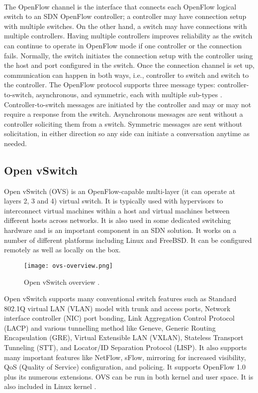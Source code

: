 \paragraph{}
The OpenFlow channel is the interface that connects each OpenFlow logical switch to an SDN OpenFlow controller; a controller may have connection setup with multiple switches. On the other hand, a switch may have connections with multiple controllers. Having multiple controllers improves reliability as the switch can continue to operate in OpenFlow mode if one controller or the connection fails. Normally, the switch initiates the connection setup with the controller using the host and port configured in the switch. Once the connection channel is set up, communication can happen in both ways, i.e., controller to switch and switch to the controller. The OpenFlow protocol supports three message types: controller-to-switch, asynchronous, and symmetric, each with multiple sub-types \cite{openflowspecification13}. Controller-to-switch messages are initiated by the controller and may or may not require a response from the switch. Asynchronous messages are sent without a controller soliciting them from a switch. Symmetric messages are sent without solicitation, in either direction so any side can initiate a conversation anytime as needed.

\subsection{Open vSwitch}\label{sec:ovs}
Open vSwitch (OVS) is an OpenFlow-capable multi-layer (it can operate at layers 2, 3 and 4) virtual switch. It is typically used with hypervisors to interconnect virtual machines within a host and virtual machines between different hosts across networks. It is also used in some dedicated switching hardware and is an important component in an SDN solution. It works on a number of different platforms including Linux and FreeBSD. It can be configured remotely as well as locally on the box.

\begin{figure}[H]
\begin{center}
	{\texttt{[image: ovs-overview.png]}}
	\caption{Open vSwitch overview \cite{ovswhatis}.}
	\label{fig:ovsoverview}
\end{center}
\end{figure}

Open vSwitch supports many conventional switch features such as Standard 802.1Q virtual LAN (VLAN) model with trunk and access ports, Network interface controller (NIC) port bonding, Link Aggregation Control Protocol (LACP) and various tunnelling method like Geneve, Generic Routing Encapsulation (GRE), Virtual Extensible LAN (VXLAN), Stateless Transport Tunneling (STT), and Locator/ID Separation Protocol (LISP). It also supports many important features like NetFlow, sFlow, mirroring for increased visibility, QoS (Quality of Service) configuration, and policing. It supports OpenFlow 1.0 plus its numerous extensions. OVS can be run in both kernel and user space. It is also included in Linux kernel \cite{ovswhatis}.

